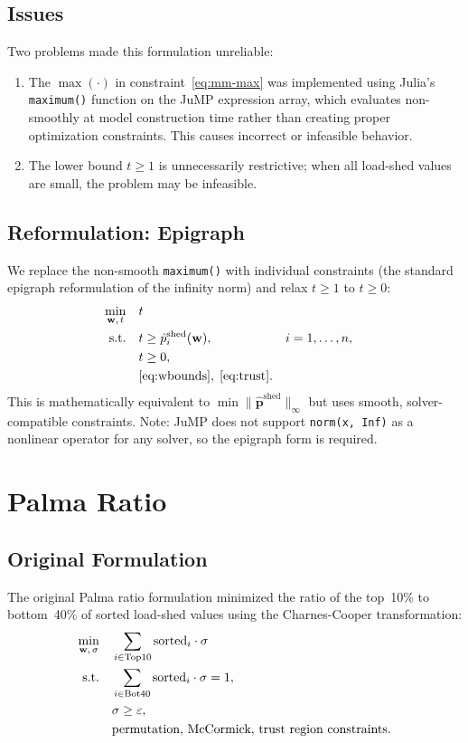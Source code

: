 \documentclass[11pt]{article}
\begin{document}
\subsection{Issues}

Two problems made this formulation unreliable:
\begin{enumerate}
    \item The $\max(\cdot)$ in constraint~\eqref{eq:mm-max} was implemented using Julia's \texttt{maximum()} function on the JuMP expression array, which evaluates non-smoothly at model construction time rather than creating proper optimization constraints. This causes incorrect or infeasible behavior.
    \item The lower bound $t \ge 1$ is unnecessarily restrictive; when all load-shed values are small, the problem may be infeasible.
\end{enumerate}

\subsection{Reformulation: Epigraph}

We replace the non-smooth \texttt{maximum()} with individual constraints (the standard epigraph reformulation of the infinity norm) and relax $t \ge 1$ to $t \ge 0$:
\begin{align}
    \min_{\mathbf{w},\,t} \quad & t \\
    \text{s.t.} \quad
    & t \ge \hat{p}_i^{\mathrm{shed}}(\mathbf{w}), & i &= 1,\dots,n, \\
    & t \ge 0, \notag \\
    & \eqref{eq:wbounds},\;\eqref{eq:trust}. \notag
\end{align}
This is mathematically equivalent to $\min \|\hat{\mathbf{p}}^{\mathrm{shed}}\|_\infty$ but uses smooth, solver-compatible constraints.
Note: JuMP does not support \texttt{norm(x, Inf)} as a nonlinear operator for any solver, so the epigraph form is required.

\section{Palma Ratio}\label{sec:palma}

\subsection{Original Formulation}

The original Palma ratio formulation minimized the ratio of the top~10\% to bottom~40\% of sorted load-shed values using the Charnes-Cooper transformation:
\begin{align}
    \min_{\mathbf{w},\,\sigma} \quad & \sum_{i \in \mathrm{Top10}} \mathrm{sorted}_i \cdot \sigma \\
    \text{s.t.} \quad
    & \sum_{i \in \mathrm{Bot40}} \mathrm{sorted}_i \cdot \sigma = 1, \\
    & \sigma \ge \varepsilon, \notag \\
    & \text{permutation, McCormick, trust region constraints.} \notag
\end{align}
\end{document}
